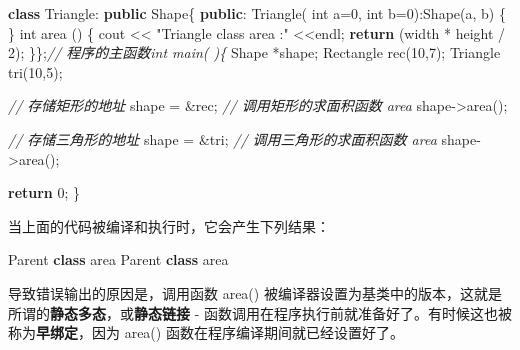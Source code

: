 \documentclass[
]{article}
\newenvironment{Shaded}{}{}
\newcommand{\CommentTok}[1]{\textcolor[rgb]{0.38,0.63,0.69}{\textit{#1}}}
\newcommand{\ControlFlowTok}[1]{\textcolor[rgb]{0.00,0.44,0.13}{\textbf{#1}}}
\newcommand{\DataTypeTok}[1]{\textcolor[rgb]{0.56,0.13,0.00}{#1}}
\newcommand{\DecValTok}[1]{\textcolor[rgb]{0.25,0.63,0.44}{#1}}
\newcommand{\KeywordTok}[1]{\textcolor[rgb]{0.00,0.44,0.13}{\textbf{#1}}}
\newcommand{\NormalTok}[1]{#1}
\newcommand{\OperatorTok}[1]{\textcolor[rgb]{0.40,0.40,0.40}{#1}}
\newcommand{\StringTok}[1]{\textcolor[rgb]{0.25,0.44,0.63}{#1}}
\begin{document}
\begin{Shaded}
\begin{Highlighting}[]
\KeywordTok{class}\NormalTok{ Triangle}\OperatorTok{:} \KeywordTok{public}\NormalTok{ Shape}\OperatorTok{\{}
   \KeywordTok{public}\OperatorTok{:}
\NormalTok{      Triangle}\OperatorTok{(} \DataTypeTok{int}\NormalTok{ a}\OperatorTok{=}\DecValTok{0}\OperatorTok{,} \DataTypeTok{int}\NormalTok{ b}\OperatorTok{=}\DecValTok{0}\OperatorTok{):}\NormalTok{Shape}\OperatorTok{(}\NormalTok{a}\OperatorTok{,}\NormalTok{ b}\OperatorTok{)} \OperatorTok{\{} \OperatorTok{\}}
      \DataTypeTok{int}\NormalTok{ area }\OperatorTok{()}
      \OperatorTok{\{} 
\NormalTok{         cout }\OperatorTok{\textless{}\textless{}} \StringTok{"Triangle class area :"} \OperatorTok{\textless{}\textless{}}\NormalTok{endl}\OperatorTok{;}
         \ControlFlowTok{return} \OperatorTok{(}\NormalTok{width }\OperatorTok{*}\NormalTok{ height }\OperatorTok{/} \DecValTok{2}\OperatorTok{);} 
      \OperatorTok{\}\};}\CommentTok{// 程序的主函数int main( )\{}
\NormalTok{   Shape }\OperatorTok{*}\NormalTok{shape}\OperatorTok{;}
\NormalTok{   Rectangle rec}\OperatorTok{(}\DecValTok{10}\OperatorTok{,}\DecValTok{7}\OperatorTok{);}
\NormalTok{   Triangle  tri}\OperatorTok{(}\DecValTok{10}\OperatorTok{,}\DecValTok{5}\OperatorTok{);}

   \CommentTok{// 存储矩形的地址}
\NormalTok{   shape }\OperatorTok{=} \OperatorTok{\&}\NormalTok{rec}\OperatorTok{;}
   \CommentTok{// 调用矩形的求面积函数 area}
\NormalTok{   shape}\OperatorTok{{-}\textgreater{}}\NormalTok{area}\OperatorTok{();}

   \CommentTok{// 存储三角形的地址}
\NormalTok{   shape }\OperatorTok{=} \OperatorTok{\&}\NormalTok{tri}\OperatorTok{;}
   \CommentTok{// 调用三角形的求面积函数 area}
\NormalTok{   shape}\OperatorTok{{-}\textgreater{}}\NormalTok{area}\OperatorTok{();}
   
   \ControlFlowTok{return} \DecValTok{0}\OperatorTok{;}
\OperatorTok{\}}
\end{Highlighting}
\end{Shaded}

当上面的代码被编译和执行时，它会产生下列结果：

\begin{Shaded}
\begin{Highlighting}[]
\NormalTok{Parent }\KeywordTok{class}\NormalTok{ area}
\NormalTok{Parent }\KeywordTok{class}\NormalTok{ area}
\end{Highlighting}
\end{Shaded}

导致错误输出的原因是，调用函数 area()
被编译器设置为基类中的版本，这就是所谓的\textbf{静态多态}，或\textbf{静态链接}
- 函数调用在程序执行前就准备好了。有时候这也被称为\textbf{早绑定}，因为
area() 函数在程序编译期间就已经设置好了。
\end{document}
